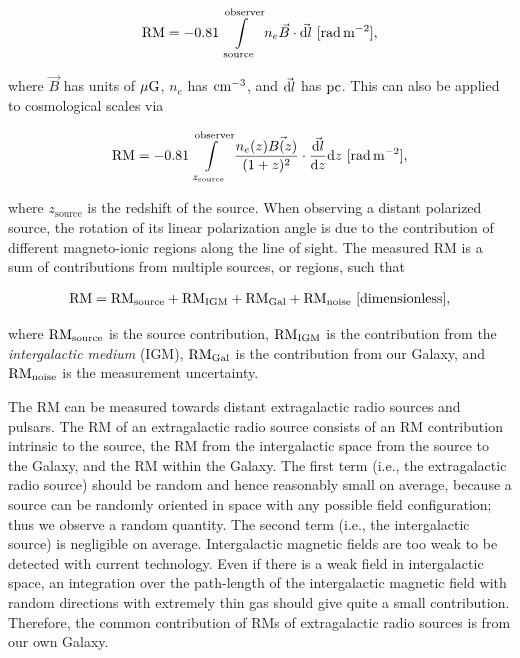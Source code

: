 \documentclass[a4paper,10pt]{article}
\begin{document}
\begin{align*}
	\mathrm{RM} = -0.81 \int\limits_\mathrm{source}^\mathrm{observer} n_e \vec{B}\cdot\vec{{\rm d}l} ~ [{\rm rad\,m^{-2}}],
\end{align*}

{\noindent}where $\vec{B}$ has units of $\mu{\rm G}$, $n_e$ has ${\rm cm^{-3}}$, and $\vec{{\rm d}l}$ has ${\rm pc}$. This can also be applied to cosmological scales via

\begin{align*}
	\mathrm{RM} = -0.81 \int\limits_{z_\mathrm{source}}^\mathrm{observer} \frac{n_e(z) \vec{B(z)}}{(1+z)^2} \cdot \frac{\vec{{\rm d}l}}{{\rm d}z} {\rm d}z ~ [{\rm rad\,m^{-2}}],
\end{align*}

{\noindent}where $z_\mathrm{source}$ is the redshift of the source. When observing a distant polarized source, the rotation of its linear polarization angle is due to the contribution of different magneto-ionic regions along the line of sight. The measured RM is a sum of contributions from multiple sources, or regions, such that

\begin{align*}
    {\rm RM} = {\rm RM}_{\rm source} + {\rm RM}_{\rm IGM} + {\rm RM}_{\rm Gal} + {\rm RM}_{\rm noise} ~ [{\rm dimensionless}],
\end{align*}

{\noindent}where ${\rm RM}_{\rm source}$ is the source contribution, ${\rm RM}_{\rm IGM}$ is the contribution from the \textit{intergalactic medium} (IGM), ${\rm RM}_{\rm Gal}$ is the contribution from our Galaxy, and ${\rm RM}_{\rm noise}$ is the measurement uncertainty.

{\noindent}The RM can be measured towards distant extragalactic radio sources and pulsars. The RM of an extragalactic radio source consists of an RM contribution intrinsic to the source, the RM from the intergalactic space from the source to the Galaxy, and the RM within the Galaxy. The first term (i.e., the extragalactic radio source) should be random and hence reasonably small on average, because a source can be randomly oriented in space with any possible field configuration; thus we observe a random quantity. The second term (i.e., the intergalactic source) is negligible on average. Intergalactic magnetic fields are too weak to be detected with current technology. Even if there is a weak field in intergalactic space, an integration over the path-length of the intergalactic magnetic field with random directions with extremely thin gas should give quite a small contribution. Therefore, the common contribution of RMs of extragalactic radio sources is from our own Galaxy. 
\end{document}
